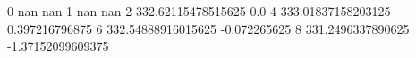 0 nan nan
1 nan nan
2 332.62115478515625 0.0
4 333.01837158203125 0.397216796875
6 332.54888916015625 -0.072265625
8 331.2496337890625 -1.37152099609375
